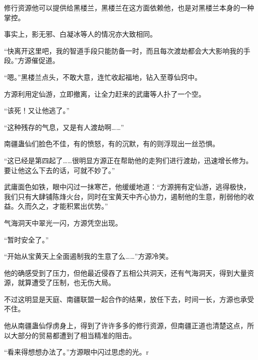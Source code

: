\begin{this_body}
修行资源他可以提供给黑楼兰，黑楼兰在这方面依赖他，也是对黑楼兰本身的一种掌控。

事实上，影无邪、白凝冰等人的情况亦大致相同。

“快离开这里吧，我的智道手段只能防备一时，而且每次渡劫都会大大影响我的手段。”方源催促道。

“嗯。”黑楼兰点头，不敢大意，连忙收起福地，钻入至尊仙窍中。

方源利用定仙游，立即撤离，让全力赶来的武庸等人扑了一个空。

“该死！又让他逃了。”

“这种残存的气息，又是有人渡劫啊……”

南疆蛊仙们脸色不佳，有的愤怒，有的沉默，有的则浮现出一丝恐惧。

“这已经是第四起了……很明显方源正在帮助他的走狗们进行渡劫，迅速增长修为。要让他这么下去的话，可就不妙了。”

武庸面色如铁，眼中闪过一抹寒芒，他缓缓地道：“方源拥有定仙游，逃得极快，我们只有大肆铺陈烽火台，同时在宝黄天中齐心协力，遏制他的生意，削弱他的收益。久而久之，才能积累出优势。”

气海洞天中翠光一闪，方源凭空出现。

“暂时安全了。”

“开始从宝黄天上全面遏制我的生意了么……”方源冷笑。

他的确感受到了压力，但他最近侵吞了五相公共洞天，还有气海洞天，得到大量资源，就算遭受了压制，也无伤大局。

不过这明显是天庭、南疆联盟一起合作的结果，放任下去，时间一长，方源也承受不住。

他从南疆蛊仙俘虏身上，得到了许许多多的修行资源，但南疆正道也清楚这点，所以大部分的贸易都遭到了相当精准的阻击。

“看来得想想办法了。”方源眼中闪过思虑的光。r

\end{this_body}

